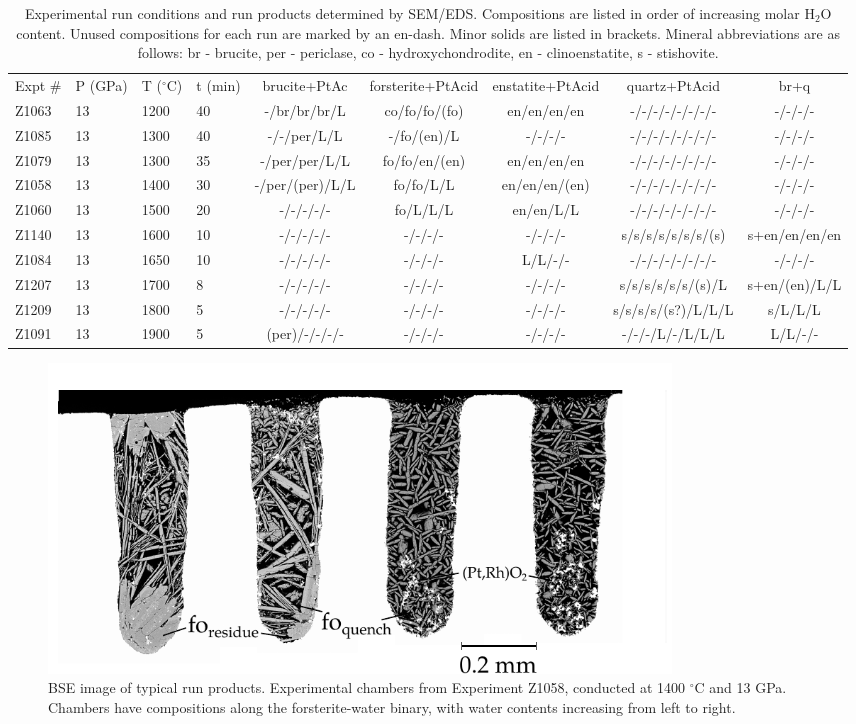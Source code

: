 \documentclass[review]{elsarticle}
\begin{document}
\begin{landscape}
\begin{table}[ht!]
\caption{Experimental run conditions and run products determined by SEM/EDS. Compositions are listed in order of increasing molar H$_2$O content. Unused compositions for each run are marked by an en-dash. Minor solids are listed in brackets. Mineral abbreviations are as follows: br - brucite, per - periclase, co - hydroxychondrodite, en - clinoenstatite, s - stishovite.}
\label{table:experiments}
\begin{tabular}{llllccccc}
Expt \# & P (GPa) & T ($^{\circ}$C) & t (min) & brucite+PtAc & forsterite+PtAcid & enstatite+PtAcid & quartz+PtAcid & br+q \\
Z1063 & 13 & 1200 & 40 & -/br/br/br/L & co/fo/fo/(fo) & en/en/en/en & -/-/-/-/-/-/-/- & -/-/-/- \\
Z1085 & 13 & 1300 & 40 & -/-/per/L/L & -/fo/(en)/L & -/-/-/- & -/-/-/-/-/-/-/- & -/-/-/- \\
Z1079 & 13 & 1300 & 35 & -/per/per/L/L & fo/fo/en/(en) & en/en/en/en & -/-/-/-/-/-/-/- & -/-/-/- \\
Z1058 & 13 & 1400 & 30 & -/per/(per)/L/L & fo/fo/L/L & en/en/en/(en) & -/-/-/-/-/-/-/- & -/-/-/- \\
Z1060 & 13 & 1500 & 20 & -/-/-/-/- & fo/L/L/L & en/en/L/L & -/-/-/-/-/-/-/- & -/-/-/- \\
Z1140 & 13 & 1600 & 10 & -/-/-/-/- & -/-/-/- & -/-/-/- & s/s/s/s/s/s/s/(s) & s+en/en/en/en \\
Z1084 & 13 & 1650 & 10 & -/-/-/-/- & -/-/-/- & L/L/-/- & -/-/-/-/-/-/-/- & -/-/-/- \\
Z1207 & 13 & 1700 & 8 & -/-/-/-/- & -/-/-/- & -/-/-/- & s/s/s/s/s/s/(s)/L & s+en/(en)/L/L \\
Z1209 & 13 & 1800 & 5 & -/-/-/-/- & -/-/-/- & -/-/-/- & s/s/s/s/(s?)/L/L/L & s/L/L/L \\
Z1091 & 13 & 1900 & 5 & (per)/-/-/-/- & -/-/-/- & -/-/-/- & -/-/-/L/-/L/L/L & L/L/-/-
\end{tabular}
\end{table}
\end{landscape}


\begin{figure}[ht!]
  \centering
      \includegraphics[width=0.8\textwidth]{figures/Z1058_1400C_13GPa_fo}
  \caption{BSE image of typical run products. Experimental chambers from Experiment Z1058, conducted at 1400 $^{\circ}$C and 13 GPa. Chambers have compositions along the forsterite-water binary, with water contents increasing from left to right.}
  \label{fig:sem}
\end{figure}
\end{document}
